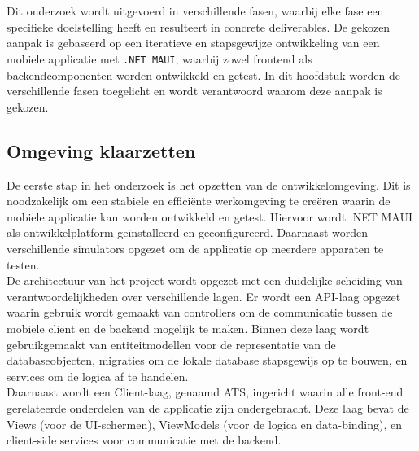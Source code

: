 
\chapter{}%
\label{ch:methodologie}

Dit onderzoek wordt uitgevoerd in verschillende fasen, waarbij elke fase een specifieke doelstelling heeft en resulteert in concrete deliverables. De gekozen aanpak is gebaseerd op een iteratieve en stapsgewijze ontwikkeling van een mobiele applicatie met \texttt{.NET MAUI}, waarbij zowel frontend als backendcomponenten worden ontwikkeld en getest. In dit hoofdstuk worden de verschillende fasen toegelicht en wordt verantwoord waarom deze aanpak is gekozen.

\section{Omgeving klaarzetten}

De eerste stap in het onderzoek is het opzetten van de ontwikkelomgeving. Dit is noodzakelijk om een stabiele en efficiënte werkomgeving te creëren waarin de mobiele applicatie kan worden ontwikkeld en getest. Hiervoor wordt .NET MAUI als ontwikkelplatform geïnstalleerd en geconfigureerd. Daarnaast worden verschillende simulators opgezet om de applicatie op meerdere apparaten te testen.\\

De architectuur van het project wordt opgezet met een duidelijke scheiding van verantwoordelijkheden over verschillende lagen. Er wordt een API-laag opgezet waarin gebruik wordt gemaakt van controllers om de communicatie tussen de mobiele client en de backend mogelijk te maken. Binnen deze laag wordt gebruikgemaakt van entiteitmodellen voor de representatie van de databaseobjecten, migraties om de lokale database stapsgewijs op te bouwen, en services om de logica af te handelen.\\

Daarnaast wordt een Client-laag, genaamd ATS, ingericht waarin alle front-end gerelateerde onderdelen van de applicatie zijn ondergebracht. Deze laag bevat de Views (voor de UI-schermen), ViewModels (voor de logica en data-binding), en client-side services voor communicatie met de backend. \\

